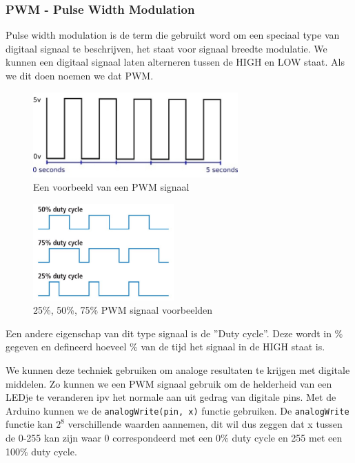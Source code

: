 \documentclass[11pt]{report}
\newcommand{\code}[1]{{\texttt{#1}}}
\newcommand{\pbr}{\hfill\break\hfill\break}
\begin{document}
\subsubsection{PWM - Pulse Width Modulation}
Pulse width modulation is de term die gebruikt word om een speciaal type van digitaal signaal te beschrijven, het staat voor signaal breedte modulatie. We kunnen een digitaal signaal laten alterneren tussen de HIGH en LOW staat. Als we dit doen noemen we dat PWM.
\begin{figure}[H]
    \centering
    \includegraphics[width=0.7\textwidth]{pwm.jpeg}
    \caption{Een voorbeeld van een PWM signaal}
\end{figure}

\newpage

\begin{figure}
    \centering
    \includegraphics[width=0.48\textwidth]{pwm_duty.jpeg}
    \caption{25\%, 50\%, 75\% PWM signaal voorbeelden}
\end{figure}
Een andere eigenschap van dit type signaal is de ''Duty cycle''. Deze wordt in \% gegeven en defineerd hoeveel \% van de tijd het signaal in de HIGH staat is.

We kunnen deze techniek gebruiken om analoge resultaten te krijgen met digitale middelen. Zo kunnen we een PWM signaal gebruik om de helderheid van een LEDje te veranderen ipv het normale aan uit gedrag van digitale pins.
\pbr
Met de Arduino kunnen we de \code{analogWrite(pin, x)} functie gebruiken. De \code{analogWrite} functie kan $2^8$ verschillende waarden aannemen, dit wil dus zeggen dat x tussen de 0-255 kan zijn waar 0 correspondeerd met een 0\% duty cycle en 255 met een 100\% duty cycle.
\end{document}
